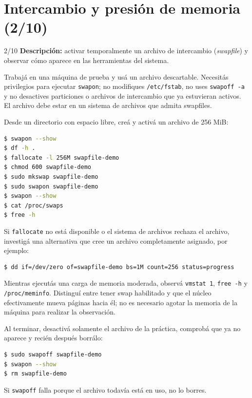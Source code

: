 \documentclass[11pt,a4paper]{article}
\begin{document}
\newpage
\section{Intercambio y presión de memoria (2/10)}

\begin{trackbox}{2/10}
\textbf{Descripción:} activar temporalmente un archivo de intercambio
(\emph{swapfile}) y observar cómo aparece en las herramientas del sistema.
\end{trackbox}

Trabajá en una máquina de prueba y usá un archivo descartable. Necesitás
privilegios para ejecutar \texttt{swapon}; no modifiques \texttt{/etc/fstab},
no uses \texttt{swapoff -a} y no desactives particiones o archivos de
intercambio que ya estuvieran activos. El archivo debe estar en un sistema de
archivos que admita swapfiles.

Desde un directorio con espacio libre, creá y activá un archivo de 256 MiB:

\begin{lstlisting}[language=bash]
$ swapon --show
$ df -h .
$ fallocate -l 256M swapfile-demo
$ chmod 600 swapfile-demo
$ sudo mkswap swapfile-demo
$ sudo swapon swapfile-demo
$ swapon --show
$ cat /proc/swaps
$ free -h
\end{lstlisting}

Si \texttt{fallocate} no está disponible o el sistema de archivos rechaza el
archivo, investigá una alternativa que cree un archivo completamente
asignado, por ejemplo:

\begin{lstlisting}[language=bash]
$ dd if=/dev/zero of=swapfile-demo bs=1M count=256 status=progress
\end{lstlisting}

Mientras ejecutás una carga de memoria
moderada, observá \texttt{vmstat 1}, \texttt{free -h} y
\texttt{/proc/meminfo}. Distinguí entre tener swap habilitado y que el núcleo
efectivamente mueva páginas hacia él; no es necesario agotar la memoria de la
máquina para realizar la observación.

Al terminar, desactivá solamente el archivo de la práctica, comprobá que ya no
aparece y recién después borrálo:

\begin{lstlisting}[language=bash]
$ sudo swapoff swapfile-demo
$ swapon --show
$ rm swapfile-demo
\end{lstlisting}

Si \texttt{swapoff} falla porque el archivo todavía está en uso, no lo borres.
\end{document}

